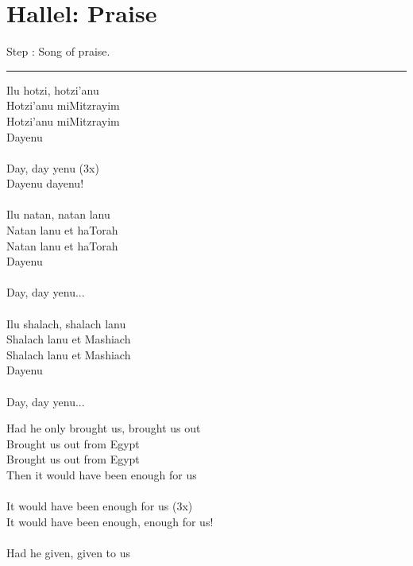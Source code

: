 \documentclass[10pt,oneside,footinclude=true,headinclude=true]{scrbook} %
\newcommand{\drawimage}[4]{
	\makebox[0pt][s]{
		\raisebox{#1}[0pt][0pt]{
			\transparent{#2}\texttt{[image: \#4]}
		}
	}
}
\begin{document}
\chapter{Hallel: Praise}
\drawimage{-1cm}{0.1}{10cm}{hallel}
\normalsize
Step \thechapter: Song of praise.

\vspace{5mm}
\hrule
\vspace{5mm}

\footnotesize
{}
\begin{paracol}{2}
\begin{leftcolumn}
\noindent Ilu hotzi, hotzi'anu\\
Hotzi'anu miMitzrayim\\
Hotzi'anu miMitzrayim\\
Dayenu\\
\\
Day, day yenu (3x)\\
Dayenu dayenu!\\
\\
Ilu natan, natan lanu\\
Natan lanu et haTorah\\
Natan lanu et haTorah\\
Dayenu\\
\\
Day, day yenu...\\
\\
Ilu shalach, shalach lanu\\
Shalach lanu et Mashiach\\
Shalach lanu et Mashiach\\
Dayenu\\
\\
Day, day yenu...\\
\end{leftcolumn}
\begin{rightcolumn}
\noindent Had he only brought us, brought us out\\
Brought us out from Egypt\\
Brought us out from Egypt\\
Then it would have been enough for us\\
\\
It would have been enough for us (3x)\\
It would have been enough, enough for us!\\
\\
Had he given, given to us\\

\end{rightcolumn}
\end{paracol}
\end{document}
